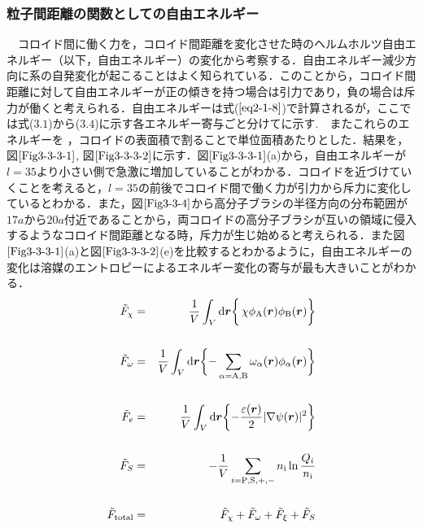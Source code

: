 \documentclass[10.5pt,a4j]{jarticle}
\newcommand{\bvec}[1]{
\mbox{\boldmath $#1$}
}%
\begin{document}
\subsubsection{粒子間距離の関数としての自由エネルギー}
　コロイド間に働く力を，コロイド間距離を変化させた時のヘルムホルツ自由エネルギー（以下，自由エネルギー）の変化から考察する．自由エネルギー減少方向に系の自発変化が起こることはよく知られている．このことから，コロイド間距離に対して自由エネルギーが正の傾きを持つ場合は引力であり，負の場合は斥力が働くと考えられる．自由エネルギーは式($\ref{eq2-1-8}$)で計算されるが，ここでは式($3.1$)から($3.4$)に示す各エネルギー寄与ごと分けてに示す.　またこれらのエネルギーを ，コロイドの表面積で割ることで単位面積あたりとした．結果を，図$\ref{Fig3-3-3-1}$,  図$\ref{Fig3-3-3-2}$に示す．図$\ref{Fig3-3-3-1}$(a)から，自由エネルギーが$l=35$より小さい側で急激に増加していることがわかる．コロイドを近づけていくことを考えると，$l=35$の前後でコロイド間で働く力が引力から斥力に変化しているとわかる．また，図$\ref{Fig3-3-4}$から高分子ブラシの半径方向の分布範囲が$17aから20a$付近であることから，両コロイドの高分子ブラシが互いの領域に侵入するようなコロイド間距離となる時，斥力が生じ始めると考えられる．また図$\ref{Fig3-3-3-1}$(a)と図$\ref{Fig3-3-3-2}$(e)を比較するとわかるように，自由エネルギーの変化は溶媒のエントロピーによるエネルギー変化の寄与が最も大きいことがわかる．
%
\begin{eqnarray}
            \tilde{F}_{\chi}&=&\frac{1}{V}\int_{V} \mathrm{d}\bvec{r}
    \biggl\{ \,\chi \phi_\mathrm{A}(\bvec{r}) \phi_\mathrm{B}(\bvec{r})\biggr\} \\ \nonumber \\
            \tilde{F}_{\omega}&=&\frac{1}{V}\int_{V} \mathrm{d}\bvec{r}
    \biggl\{-\sum_{ \alpha=\mathrm{A},\mathrm{B} }
           \omega_\mathrm{\alpha}(\bvec{r})\phi_\mathrm{\alpha}(\bvec{r})   \biggr\}\\ \nonumber \\
            \tilde{F}_{e}&=&\frac{1}{V}\int_{V} \mathrm{d}\bvec{r}
    \biggl\{-\frac{\varepsilon(\bm{r})}{2}|\nabla\psi(\bm{r})|^2
           \biggr\} \\ \nonumber \\
        \tilde{F}_{S} &=& -\frac{1}{V}\sum_{i=\rm{P,S,+,-}} n_{\rm{i}} \ln \frac{Q_i}{n_{\rm{i}}} \\ \nonumber \\
        \tilde{F}_{\rm {total}} &=& \tilde{F}_{\chi} + \tilde{F}_{\omega} + \tilde{F}_{\xi} + \tilde{F}_{S}
\end{eqnarray}
\end{document}
